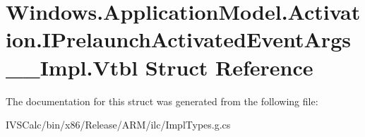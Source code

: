 \hypertarget{struct_windows_1_1_application_model_1_1_activation_1_1_i_prelaunch_activated_event_args_____impl_1_1_vtbl}{}\section{Windows.\+Application\+Model.\+Activation.\+I\+Prelaunch\+Activated\+Event\+Args\+\_\+\+\_\+\+Impl.\+Vtbl Struct Reference}
\label{struct_windows_1_1_application_model_1_1_activation_1_1_i_prelaunch_activated_event_args_____impl_1_1_vtbl}


The documentation for this struct was generated from the following file\+:\begin{DoxyCompactItemize}
\item 
I\+V\+S\+Calc/bin/x86/\+Release/\+A\+R\+M/ilc/Impl\+Types.\+g.\+cs\end{DoxyCompactItemize}

